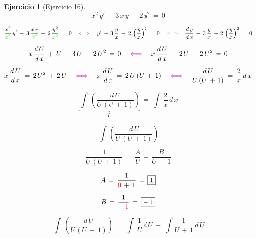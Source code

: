 \documentclass[a4paper,11pt]{book}
\newtheorem{ejer}{Ejercicio}[section]
\begin{document}
\begin{ejer}[Ejercicio 16] 

  $$x^{2}\,y'\,-\,3\,x\,y\,-\,2\,y^{2}\,=\,0$$ 



  

 $$\dfrac{x^{2}}{\textcolor{green}{x^{2}} }\,y'\,-\,3\,\dfrac{x\,y}{\textcolor{green}{x^{2}}}\,-\,2\,\dfrac{y^{2}}{\textcolor{green}{x^{2}}}\,=\,0 \quad \textcolor{byzantine}{\iff} \quad y'\,-\,3\,\dfrac{y}{x}\,-\,2\,\left(\dfrac{y}{x} \right)^{2}\,=\,0 \quad \textcolor{byzantine}{\iff} \quad \dfrac{d\,y}{d\,x}\,-\,3\,\dfrac{y}{x}\,-\,2\,\left(\dfrac{y}{x} \right)^{2}\,=\,0$$ 

  

 $$x\,\dfrac{d\,U}{d\,x}\,+\,U\,-\,3\,U\,-\,2\,U^{2}\,=\,0 \quad \textcolor{byzantine}{\iff} \quad x\,\dfrac{d\,U}{d\,x}\,-\,2\,U\,-\,2\,U^{2}\,=\,0$$ 

  

 $$x\,\dfrac{d\,U}{d\,x}\,=\,2\,U^{2}\,+\,2\,U \quad \textcolor{byzantine}{\iff} \quad x\,\dfrac{d\,U}{d\,x}\,=\,2\,U\,(U\,+\,1) \quad \textcolor{byzantine}{\iff} \quad \dfrac{d\,U}{U\,(U\,+\,1)}\,=\,\dfrac{2}{x}\,d\,x$$ 

  

$$\underbrace{\displaystyle\,\int\,\left(\dfrac{d\,U}{U\,(U\,+\,1)} \right)}_{I_{1}}\,=\,\displaystyle\,\int\,\dfrac{2}{x}\,d\,x$$ 

  

\begin{tcolorbox}[colback=red!5!white,colframe=red!75!black,fonttitle=\bfseries,title=$I_{1}$]  

  

$$\displaystyle\,\int\,\left(\dfrac{d\,U}{U\,(U\,+\,1)} \right)$$ 

  

$$\dfrac{1}{U\,(U\,+\,1)}\,=\,\dfrac{A}{U}\,+\,\dfrac{B}{U\,+\,1}$$ 

  

$$A\,=\,\dfrac{1}{\textcolor{red}{0}\,+\,1}\,=\,\boxed{1}$$ 

  

$$B\,=\,\dfrac{1}{\textcolor{red}{-\,1}}\,=\,\boxed{-\,1}$$ 

  

$$\displaystyle\,\int\,\left(\dfrac{d\,U}{U\,(U\,+\,1)} \right)\,=\,\displaystyle\,\int\,\dfrac{1}{U}\,d\,U\,-\,\displaystyle\,\int\dfrac{1}{U\,+\,1}\,d\,U$$ 

  


\end{tcolorbox}
\end{ejer}
\end{document}
